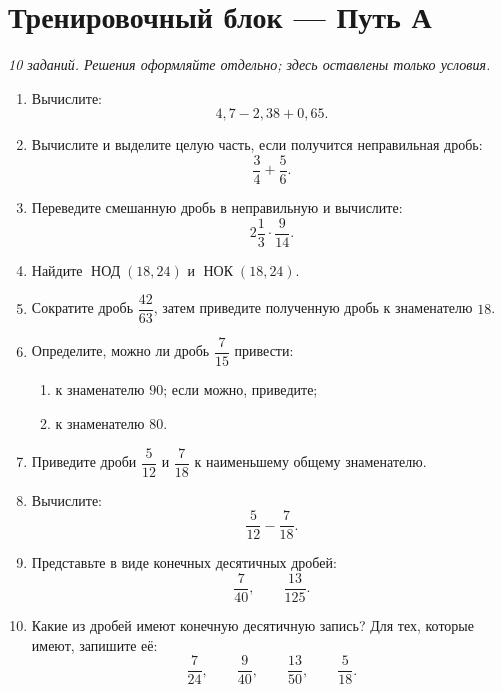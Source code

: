\documentclass[a4paper,12pt]{article}
\newcommand{\nodop}{\mathop{\text{НОД}}\nolimits}
\newcommand{\nokop}{\mathop{\text{НОК}}\nolimits}
\begin{document}
\section*{Тренировочный блок --- Путь А}
\textit{10 заданий. Решения оформляйте отдельно; здесь оставлены только условия.}

\begin{enumerate}[label=\textbf{\arabic*.}]
  \item Вычислите:
  \[
  4{,}7-2{,}38+0{,}65.
  \]

  \item Вычислите и выделите целую часть, если получится неправильная дробь:
  \[
  \frac34+\frac56.
  \]

  \item Переведите смешанную дробь в неправильную и вычислите:
  \[
  2\frac13\cdot\frac9{14}.
  \]

  \item Найдите \(\nodop(18,24)\) и \(\nokop(18,24)\).

  \item Сократите дробь \(\dfrac{42}{63}\), затем приведите полученную дробь к знаменателю \(18\).

  \item Определите, можно ли дробь \(\dfrac7{15}\) привести:
  \begin{enumerate}[label=\alph*)]
    \item к знаменателю \(90\); если можно, приведите;
    \item к знаменателю \(80\).
  \end{enumerate}

  \item Приведите дроби \(\dfrac5{12}\) и \(\dfrac7{18}\) к наименьшему общему знаменателю.

  \item Вычислите:
  \[
  \frac5{12}-\frac7{18}.
  \]

  \item Представьте в виде конечных десятичных дробей:
  \[
  \frac7{40},\qquad \frac{13}{125}.
  \]

  \item Какие из дробей имеют конечную десятичную запись? Для тех, которые имеют, запишите её:
  \[
  \frac7{24},\qquad \frac9{40},\qquad \frac{13}{50},\qquad \frac5{18}.
  \]
\end{enumerate}

\clearpage
\end{document}
